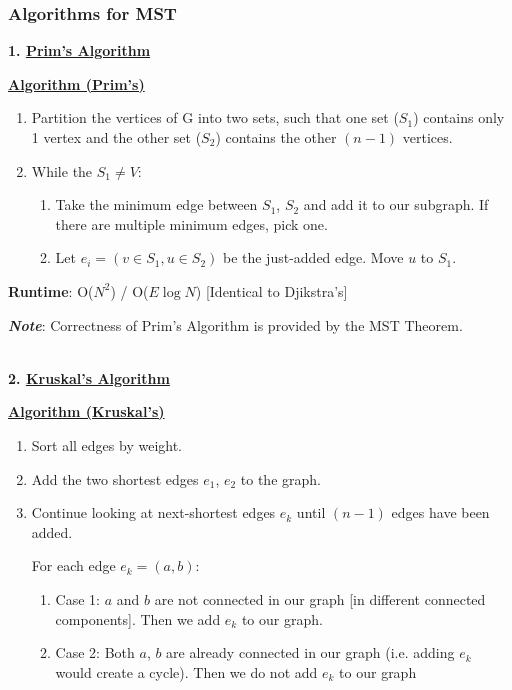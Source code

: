 \documentclass[12pt]{extarticle}
\theoremstyle{definition}
\theoremstyle{remark}
\newcommand{\probtitle}[1]{\noindent \textbf{\ul{#1}}}
\begin{document}
\subsubsection*{Algorithms for MST}
\noindent\textbf{1. \ul{Prim's Algorithm}}
\begin{tcolorbox}[colback=red!40!yellow!15!white]
    \noindent\probtitle{Algorithm (Prim's)}
    \begin{enumerate}
        \item Partition the vertices of G into two sets, such that one set ($S_1$) contains only 1 vertex and the other set ($S_2$) contains the other $(n-1)$ vertices.
        \item While the $S_1\neq V$: \begin{enumerate}
            \item Take the minimum edge between $S_1$, $S_2$ and add it to our subgraph. If there are multiple minimum edges, pick one.
            \item Let $e_i=(v\in S_1,u\in S_2)$ be the just-added edge. Move $u$ to $S_1$.
        \end{enumerate}
    \end{enumerate}
    \vspace{8pt}
    \textbf{Runtime}: O($N^2$) / O($E\log N$) [Identical to Djikstra's]
\end{tcolorbox}

\vspace{8pt}
\noindent\textbf{\textit{Note}}: Correctness of Prim's Algorithm is provided by the MST Theorem.

~\\
\noindent\textbf{2. \ul{Kruskal's Algorithm}}
\begin{tcolorbox}[colback=red!70!yellow!15!white]
    \noindent\probtitle{Algorithm (Kruskal’s)}
    \begin{enumerate}
        \item Sort all edges by weight.
        \item Add the two shortest edges $e_1$, $e_2$ to the graph.
        \item Continue looking at next-shortest edges $e_k$ until $(n-1)$ edges have been added.

        For each edge $e_k=(a,b)$:
        \begin{enumerate}
            \item Case 1: $a$ and $b$ are not connected in our graph [in different connected components]. Then we add $e_k$ to our graph.
            \item Case 2: Both $a$, $b$ are already connected in our graph (i.e. adding $e_k$ would create a cycle). Then we do not add $e_k$ to our graph
        \end{enumerate}
    \end{enumerate}
\end{tcolorbox}
\end{document}
